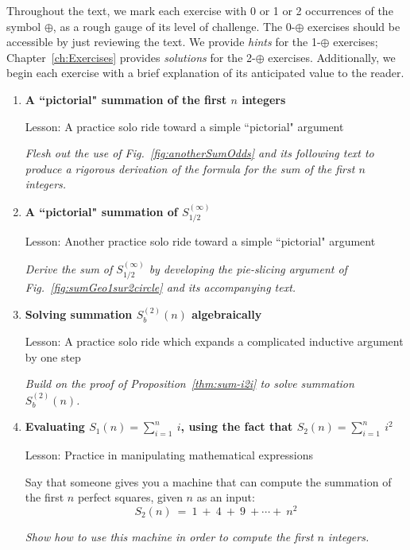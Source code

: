 Throughout the text, we mark each exercise with 0 or 1 or 2 occurrences of the symbol $\oplus$, as a rough gauge of its level of challenge.  The 0-$\oplus$ exercises should be accessible by just reviewing the text.  We provide {\em hints} for the 1-$\oplus$ exercises; Chapter~\ref{ch:Exercises} provides {\em solutions} for the 2-$\oplus$ exercises.  Additionally, we begin each exercise with a brief explanation of its anticipated value to the reader.

\begin{enumerate}
\item
{\bf A ``pictorial" summation of the first $n$ integers}

{\sc Lesson:} A practice solo ride toward a simple ``pictorial" argument

\smallskip

{\em Flesh out the use of Fig.~\ref{fig:anotherSumOdds} and its following text to produce a rigorous derivation of the formula for the sum of the first $n$ integers.}

\item
{\bf A ``pictorial" summation of $S^{(\infty)}_{1/2}$}

{\sc Lesson:} Another practice solo ride toward a simple ``pictorial" argument

\smallskip

{\em Derive the sum of $S^{(\infty)}_{1/2}$ by developing the pie-slicing argument of Fig.~\ref{fig:sumGeo1sur2circle} and its accompanying text.}

\item
{\bf Solving summation $S_b^{(2)}(n)$ algebraically}

{\sc Lesson:} A practice solo ride which expands a complicated inductive argument by one step

\smallskip

{\em Build on the proof of Proposition~\ref{thm:sum-i2i} to solve summation $S_b^{(2)}(n)$.}

\item
{\bf Evaluating $S_1(n) = \sum_{i=1}^n \ i$, using the fact that $S_2(n) = \sum_{i=1}^n \ i^2$}

{\sc Lesson:} Practice in manipulating mathematical expressions

\smallskip

Say that someone gives you a machine that can compute the summation of the first $n$ perfect squares, given $n$ as an input:
\[ S_2(n)  \ = \ 1 \  + \ 4 \ + \ 9 \ +  \cdots + \ n^2 \]

{\em Show how to use this machine in order to compute the first $n$ integers.}


\end{enumerate}

